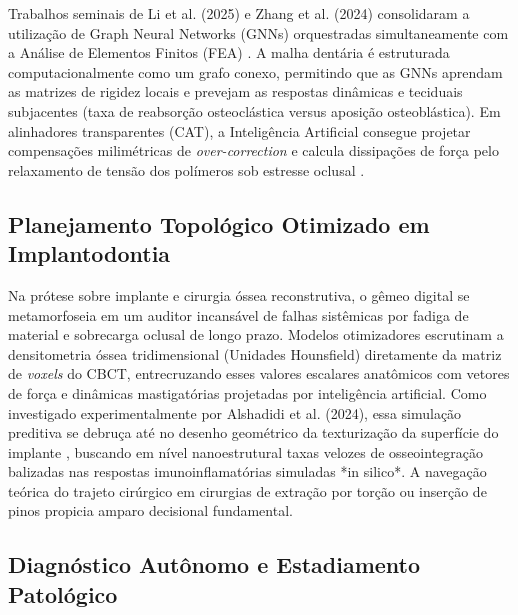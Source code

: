 Trabalhos seminais de Li et al. (2025) e Zhang et al. (2024) consolidaram a utilização de Graph Neural Networks (GNNs) orquestradas simultaneamente com a Análise de Elementos Finitos (FEA) \cite{li2025impacts, zhang2024recursive}. A malha dentária é estruturada computacionalmente como um grafo conexo, permitindo que as GNNs aprendam as matrizes de rigidez locais e prevejam as respostas dinâmicas e teciduais subjacentes (taxa de reabsorção osteoclástica versus aposição osteoblástica). Em alinhadores transparentes (CAT), a Inteligência Artificial consegue projetar compensações milimétricas de \textit{over-correction} e calcula dissipações de força pelo relaxamento de tensão dos polímeros sob estresse oclusal \cite{li2024aligner, li2025impacts}.


\subsection{Planejamento Topológico Otimizado em Implantodontia}
\label{subsec:implantes}

Na prótese sobre implante e cirurgia óssea reconstrutiva, o gêmeo digital se metamorfoseia em um auditor incansável de falhas sistêmicas por fadiga de material e sobrecarga oclusal de longo prazo. Modelos otimizadores escrutinam a densitometria óssea tridimensional (Unidades Hounsfield) diretamente da matriz de \textit{voxels} do CBCT, entrecruzando esses valores escalares anatômicos com vetores de força e dinâmicas mastigatórias projetadas por inteligência artificial. Como investigado experimentalmente por Alshadidi et al. (2024), essa simulação preditiva se debruça até no desenho geométrico da texturização da superfície do implante \cite{alshadidi2024surface}, buscando em nível nanoestrutural taxas velozes de osseointegração balizadas nas respostas imunoinflamatórias simuladas *in silico*. A navegação teórica do trajeto cirúrgico em cirurgias de extração por torção ou inserção de pinos \cite{xing2024clinical} propicia amparo decisional fundamental.

\subsection{Diagnóstico Autônomo e Estadiamento Patológico}
\label{subsec:diagnostico}

